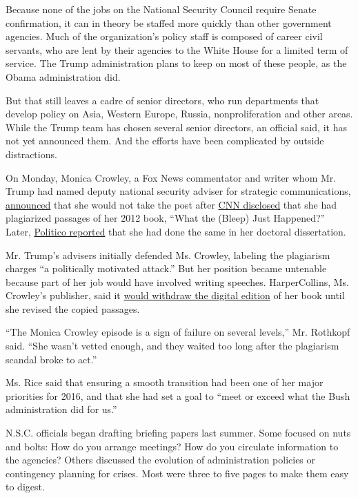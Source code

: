Because none of the jobs on the National Security Council require Senate
confirmation, it can in theory be staffed more quickly than other
government agencies. Much of the organization's policy staff is composed
of career civil servants, who are lent by their agencies to the White
House for a limited term of service. The Trump administration plans to
keep on most of these people, as the Obama administration did.

But that still leaves a cadre of senior directors, who run departments
that develop policy on Asia, Western Europe, Russia, nonproliferation
and other areas. While the Trump team has chosen several senior
directors, an official said, it has not yet announced them. And the
efforts have been complicated by outside distractions.

On Monday, Monica Crowley, a Fox News commentator and writer whom Mr.
Trump had named deputy national security adviser for strategic
communications,
\href{https://www.nytimes.com/2017/01/16/us/politics/monica-crowley-plagiarism.html}{announced}
that she would not take the post after
\href{http://money.cnn.com/interactive/news/kfile-trump-monica-crowley-plagiarized-multiple-sources-2012-book/}{CNN
disclosed} that she had plagiarized passages of her 2012 book, ``What
the (Bleep) Just Happened?'' Later,
\href{http://www.politico.com/magazine/story/2017/01/monica-crowley-plagiarism-phd-dissertation-columbia-214612}{Politico
reported} that she had done the same in her doctoral dissertation.

Mr. Trump's advisers initially defended Ms. Crowley, labeling the
plagiarism charges ``a politically motivated attack.'' But her position
became untenable because part of her job would have involved writing
speeches. HarperCollins, Ms. Crowley's publisher, said it
\href{https://www.nytimes.com/2017/01/10/business/harpercollins-pulls-monica-crowley-book-for-plagiarism.html}{would
withdraw the digital edition} of her book until she revised the copied
passages.

``The Monica Crowley episode is a sign of failure on several levels,''
Mr. Rothkopf said. ``She wasn't vetted enough, and they waited too long
after the plagiarism scandal broke to act.''

Ms. Rice said that ensuring a smooth transition had been one of her
major priorities for 2016, and that she had set a goal to ``meet or
exceed what the Bush administration did for us.''

N.S.C. officials began drafting briefing papers last summer. Some
focused on nuts and bolts: How do you arrange meetings? How do you
circulate information to the agencies? Others discussed the evolution of
administration policies or contingency planning for crises. Most were
three to five pages to make them easy to digest.

